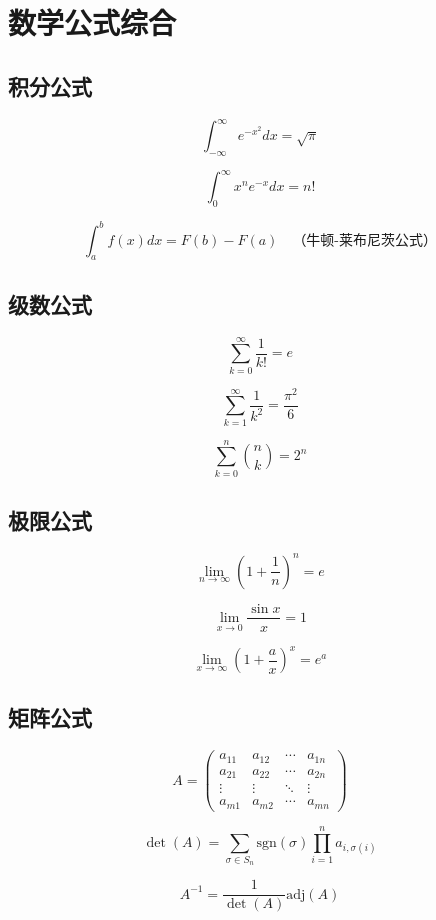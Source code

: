 \section{数学公式综合}

\subsection{积分公式}

\[
\int_{-\infty}^{\infty} e^{-x^2} dx = \sqrt{\pi}
\]

\[
\int_{0}^{\infty} x^n e^{-x} dx = n!
\]

\[
\int_a^b f(x) dx = F(b) - F(a) \quad \text{（牛顿-莱布尼茨公式）}
\]

\subsection{级数公式}

\[
\sum_{k=0}^{\infty} \frac{1}{k!} = e
\]

\[
\sum_{k=1}^{\infty} \frac{1}{k^2} = \frac{\pi^2}{6}
\]

\[
\sum_{k=0}^{n} \binom{n}{k} = 2^n
\]

\subsection{极限公式}

\[
\lim_{n \to \infty} \left( 1 + \frac{1}{n} \right)^n = e
\]

\[
\lim_{x \to 0} \frac{\sin x}{x} = 1
\]

\[
\lim_{x \to \infty} \left( 1 + \frac{a}{x} \right)^x = e^a
\]

\subsection{矩阵公式}

\[
A = \begin{pmatrix}
a_{11} & a_{12} & \cdots & a_{1n} \\
a_{21} & a_{22} & \cdots & a_{2n} \\
\vdots & \vdots & \ddots & \vdots \\
a_{m1} & a_{m2} & \cdots & a_{mn}
\end{pmatrix}
\]

\[
\det(A) = \sum_{\sigma \in S_n} \text{sgn}(\sigma) \prod_{i=1}^{n} a_{i,\sigma(i)}
\]

\[
A^{-1} = \frac{1}{\det(A)} \text{adj}(A)
\]


